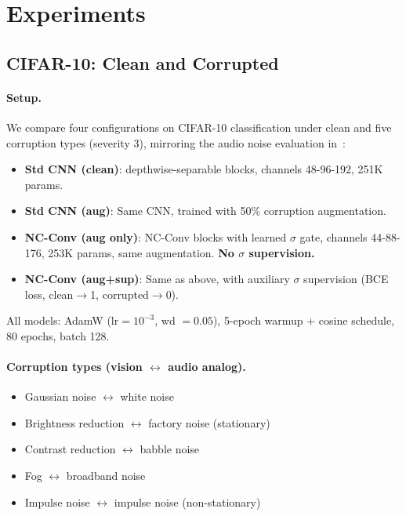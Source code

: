 \documentclass[10pt,twocolumn,letterpaper]{article}
\begin{document}
\section{Experiments}
\label{sec:experiments}

\subsection{CIFAR-10: Clean and Corrupted}

\paragraph{Setup.}
We compare four configurations on CIFAR-10 classification under clean and five corruption types (severity 3), mirroring the audio noise evaluation in~\cite{choi2026ncssm}:
\begin{itemize}
\setlength\itemsep{0pt}
\item \textbf{Std CNN (clean)}: depthwise-separable blocks, channels 48-96-192, 251K params.
\item \textbf{Std CNN (aug)}: Same CNN, trained with 50\% corruption augmentation.
\item \textbf{NC-Conv (aug only)}: NC-Conv blocks with learned $\sigma$ gate, channels 44-88-176, 253K params, same augmentation. \textbf{No $\sigma$ supervision.}
\item \textbf{NC-Conv (aug+sup)}: Same as above, with auxiliary $\sigma$ supervision (BCE loss, clean$\to$1, corrupted$\to$0).
\end{itemize}
All models: AdamW ($\text{lr}=10^{-3}$, wd $=0.05$), 5-epoch warmup + cosine schedule, 80 epochs, batch 128.

\paragraph{Corruption types (vision $\leftrightarrow$ audio analog).}
\begin{itemize}
\setlength\itemsep{0pt}
\item Gaussian noise $\leftrightarrow$ white noise
\item Brightness reduction $\leftrightarrow$ factory noise (stationary)
\item Contrast reduction $\leftrightarrow$ babble noise
\item Fog $\leftrightarrow$ broadband noise
\item Impulse noise $\leftrightarrow$ impulse noise (non-stationary)
\end{itemize}
\end{document}
